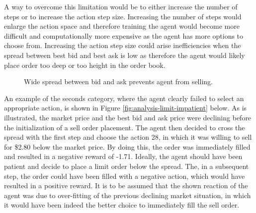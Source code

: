 A way to overcome this limitation would be to either increase the number of steps or to increase the action step size.
Increasing the number of steps would enlarge the action space and therefore training the agent would become more difficult and computationally more expensive as the agent has more options to choose from.
Increasing the action step size could arise inefficiencies when the spread between best bid and best ask is low as therefore the agent would likely place order too deep or too height in the order book.
\begin{figure}[H]
    \centering
    \caption{Wide spread between bid and ask prevents agent from selling.}
    \label{fig:analysis-limit-wide-spread-sell}
\end{figure}

An example of the seconds category, where the agent clearly failed to select an appropriate action, is shown in Figure \ref{fig:analysis-limit-impatient} below.
As is illustrated, the market price and the best bid and ask price were declining before the initialization of a sell order placement. 
The agent then decided to cross the spread with the first step and choose the action 28, in which it was willing to sell for \$2.80 below the market price.
By doing this, the order was immediately filled and resulted in a negative reward of -1.71.
Ideally, the agent should have been patient and decide to place a limit order below the spread.
The, in a subsequent step, the order could have been filled with a negative action, which would have resulted in a positive reward.
It is to be assumed that the shown reaction of the agent was due to over-fitting of the previous declining market situation, in which it would have been indeed the better choice to immediately fill the sell order.

